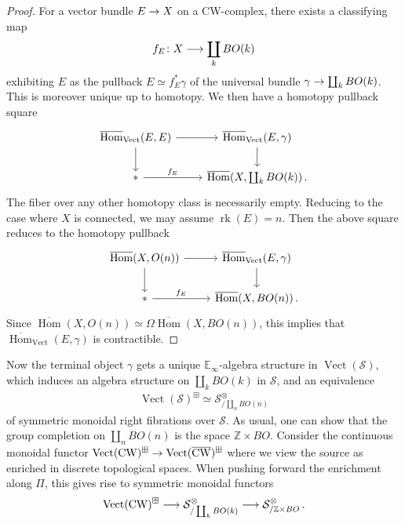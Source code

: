\documentclass[10pt]{amsart}
\numberwithin{equation}{section}
\theoremstyle{definition}
\DeclareMathOperator{\Hom}{Hom}
\DeclareMathOperator{\rk}{rk}
\DeclareMathOperator{\Vect}{Vect}
\DeclareMathOperator{\CW}{CW}
\newcommand{\bE}{\mathbb{E}}
\newcommand{\bZ}{\mathbb{Z}}
\newcommand{\cS}{\mathcal{S}}
\renewcommand{\to}{\mathchoice{\longrightarrow}{\rightarrow}{}{}}
\begin{document}
\begin{proof}
	For a vector bundle $E\to X$ on a CW-complex, there exists a classifying map
	\begin{align*}
		f_{E}\colon X\to \coprod_{k} BO(k)
	\end{align*}
	exhibiting $E$ as the pullback $E\simeq f_{E}^{*} \gamma$ of the universal bundle $\gamma \to \coprod_{k} BO(k)$. This is moreover unique up to homotopy. We then have a homotopy pullback square
	\begin{equation*}
		\begin{tikzcd}
			\overline{\Hom}_{\Vect}(E,E) \arrow[r] \arrow[d]      &   \overline{\Hom}_{\Vect}(E, \gamma)  \arrow[d] \\
			\ast  \arrow[r, "f_{E}"]               &    \overline{\Hom}(X,\coprod_{k} BO(k)) \, .
		\end{tikzcd}
	\end{equation*}
	The fiber over any other homotopy class is necessarily empty. Reducing to the case where $X$ is connected, we may assume $\rk(E)=n$.
  Then the above square reduces to the homotopy pullback
	\begin{equation*}
		\begin{tikzcd}
			\overline{\Hom}(X, O(n)) \arrow[r] \arrow[d]      &   \overline{\Hom}_{\Vect}(E, \gamma)  \arrow[d] \\
			\ast  \arrow[r, "f_{E}"]               &    \overline{\Hom}(X,BO(n)) \,.
		\end{tikzcd}
	\end{equation*}
	Since $\overline{\Hom}(X, O(n)) \simeq \Omega\overline{\Hom}(X, BO(n))$, this implies that $\overline{\Hom}_{\Vect}(E,\gamma)$ is contractible.
\end{proof}
Now the terminal object $\gamma$ gets a unique $\bE_{\infty}$-algebra structure in $\Vect(\cS)$, which induces an algebra structure on $\coprod_{k} BO(k)$ in $\cS$, and an equivalence
\begin{align*}
	\Vect(\cS)^{\boxplus} \simeq \cS_{/\coprod_{n} BO(n)}^{\otimes}
\end{align*}
of symmetric monoidal right fibrations over $\cS$.
As usual, one can show that the group completion on $\coprod_{n} BO(n)$ is the space $\bZ \times BO$. Consider the continuous monoidal functor $\Vect(\CW)^{\boxplus} \to \Vect(\overline{\CW})^{\boxplus}$ where we view the source as enriched in discrete topological spaces. When pushing forward the enrichment along $\Pi$, this gives rise to symmetric monoidal functors
\begin{align*}
	\Vect(\CW)^{\boxplus} \to \cS_{/\coprod_{k} BO(k)}^{\otimes} \to \cS_{/\bZ\times BO}^{\otimes} \,.
\end{align*}
\end{document}
